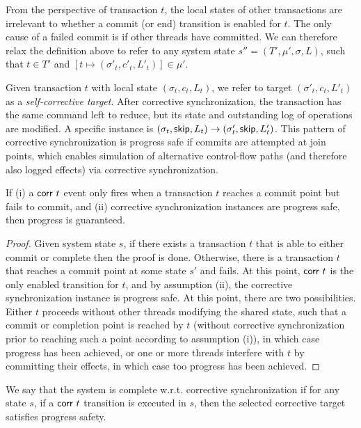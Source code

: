 \noindent
From the perspective of transaction $t$, the local states of other transactions are irrelevant to whether a commit (or end) transition is enabled for $t$. The only cause of a failed commit is if other threads have committed. We can therefore relax the definition above to refer to any system state $s''=(T',\mu',\sigma,L)$, such that $t \in T'$ and 
$[t \mapsto  (\sigma'_t,c'_t,L'_t)] \in \mu'$.

Given transaction $t$ with local state $(\sigma_t,c_t,L_t)$, we refer to target
	$(\sigma'_t,c_t,L'_t)$ as a \emph{self-corrective target}. After corrective synchronization, the transaction has the same command left to reduce, but its state and outstanding log of operations are modified. A specific instance is $(\sigma_t,{\sf skip},L_t) \rightarrow (\sigma'_t,{\sf skip},L'_t)$. This pattern of corrective synchronization is progress safe if commits are attempted at join points, which enables simulation of alternative control-flow paths (and therefore also logged effects) via corrective synchronization.

\begin{theorem}[Progress]\label{Th:progress} If (i) a ${\sf corr}\ t$ event only fires when a transaction $t$ reaches a commit point but fails to commit, and (ii) corrective synchronization instances are progress safe, then progress is guaranteed.
	\begin{proof}
	Given system state $s$, if there exists a transaction $t$ that is able to either commit or complete then the proof is done. Otherwise, there is a transaction $t$ that reaches a commit point at some state $s'$ and fails. At this point, ${\sf corr}\ t$ is the only enabled transition for $t$, and by assumption (ii), the corrective synchronization instance is progress safe. At this point, there are two possibilities. Either $t$ proceeds without other threads modifying the shared state, such that a commit or completion point is reached by $t$ (without corrective synchronization prior to reaching such a point according to assumption (i)), in which case progress has been achieved, or one or more threads interfere with $t$ by committing their effects, in which case too progress has been achieved.
	\end{proof}
\end{theorem}

\begin{definition} 
	We say that the system is complete w.r.t. corrective synchronization if for any state $s$, if a ${\sf corr}\ t$ transition is executed in $s$, then the selected corrective target satisfies progress safety.
\end{definition}

